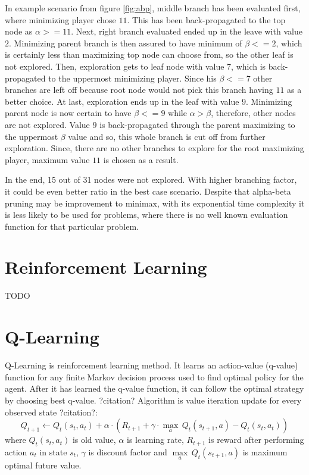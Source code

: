 In example scenario from figure \ref{fig:abp}, middle branch has been evaluated
first, where minimizing player chose $11$. This has been back-propagated
to the top node as $\alpha{>=}11$. Next, right branch evaluated ended up in the
leave with value $2$. Minimizing parent branch is then assured to have minimum
of $\beta{<=}2$, which is certainly less than maximizing top node can choose
from, so the other leaf is not explored. Then, exploration gets to leaf node
with value 7, which is back-propagated to the uppermost minimizing player.
Since his $\beta{<=}7$ other branches are left off because root node would not
pick this branch having $11$ as a better choice. At last, exploration ends up
in the leaf with value $9$. Minimizing parent node is now certain to have
$\beta{<=}9$ while $\alpha{>}\beta$, therefore, other nodes are not explored.
Value $9$ is back-propagated through the parent maximizing to the uppermost
$\beta$ value and so, this whole branch is cut off from further exploration.
Since, there are no other branches to explore for the root maximizing player,
maximum value $11$ is chosen as a result.

In the end, 15 out of 31 nodes were not explored. With higher branching factor,
it could be even better ratio in the best case scenario. Despite that
alpha-beta pruning may be improvement to minimax, with its exponential
time complexity it is less likely to be used for problems, where there is no
well known evaluation function for that particular problem.


\section{Reinforcement Learning}
TODO

\section{Q-Learning}
Q-Learning is reinforcement learning method. It learns an action-value
(q-value) function for any finite Markov decision process used to find
optimal policy for the agent. After it has learned the q-value function,
it can follow the optimal strategy by choosing best q-value. ?citation?
Algorithm is value iteration update for every observed state ?citation?:
\begin{equation}
Q_{t+1} \leftarrow Q_t(s_t, a_t) + \alpha \cdot (
    R_{t+1} + \gamma\cdot {\max_a}\,Q_t(s_{t+1}, a) - Q_t(s_t, a_t)
)
\end{equation}
where $Q_t(s_t, a_t)$ is old value, $\alpha$ is learning rate, $R_{t+1}$ is
reward after performing action $a_t$ in state $s_t$, $\gamma$ is discount
factor and $\underset{a}{\max}\,Q_t(s_{t+1}, a)$ is maximum optimal future
value.

